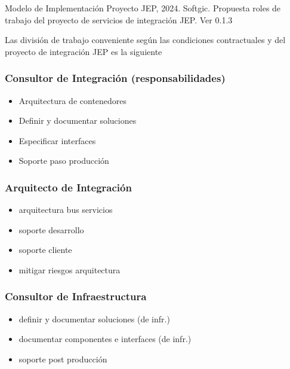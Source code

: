 \documentclass[
  paper=a4,
  ,captions=tableheading
]{scrartcl}
\providecommand{\tightlist}{%
  \setlength{\itemsep}{0pt}\setlength{\parskip}{0pt}}
\renewenvironment{quote}{\begin{customblockquote}\list{}{\rightmargin=0em\leftmargin=0em}%
\item\relax\color{blockquote-text}\ignorespaces}{\unskip\unskip\endlist\end{customblockquote}}
\begin{document}
\begin{quote}
Modelo de Implementación Proyecto JEP, 2024. Softgic. Propuesta roles de
trabajo del proyecto de servicios de integración JEP. Ver 0.1.3
\end{quote}

Las división de trabajo conveniente según las condiciones contractuales
y del proyecto de integración JEP es la siguiente

\subsubsection{Consultor de Integración
(responsabilidades)}\label{sec:consultor-de-integraciuxf3n-responsabilidades}

\begin{itemize}
\tightlist
\item
  Arquitectura de contenedores
\item
  Definir y documentar soluciones
\item
  Especificar interfaces
\item
  Soporte paso producción
\end{itemize}

\subsubsection{Arquitecto de
Integración}\label{sec:arquitecto-de-integraciuxf3n}

\begin{itemize}
\tightlist
\item
  arquitectura bus servicios
\item
  soporte desarrollo
\item
  soporte cliente
\item
  mitigar riesgos arquitectura
\end{itemize}

\subsubsection{Consultor de
Infraestructura}\label{sec:consultor-de-infraestructura}

\begin{itemize}
\tightlist
\item
  definir y documentar soluciones (de infr.)
\item
  documentar componentes e interfaces (de infr.)
\item
  soporte post producción
\end{itemize}
\end{document}
